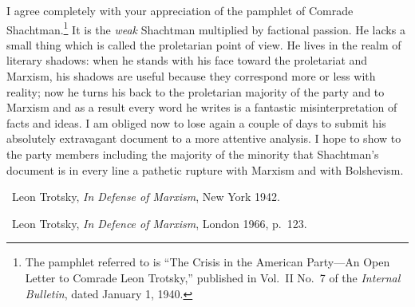 

I agree completely with your appreciation of the pamphlet of Comrade Shachtman.\footnote{The pamphlet referred to is ``The Crisis in the American Party---An Open Letter to Comrade Leon Trotsky,'' published in Vol.~II No.~7 of the \emph{Internal Bulletin}, dated January 1, 1940.} It is the \emph{weak} Shachtman multiplied by factional passion. He lacks a small thing which is called the proletarian point of view. He lives in the realm of literary shadows: when he stands with his face toward the proletariat and Marxism, his shadows are useful because they correspond more or less with reality; now he turns his back to the proletarian majority of the party and to Marxism and as a result every word he writes is a fantastic misinterpretation of facts and ideas. I am obliged now to lose again a couple of days to submit his absolutely extravagant document to a more attentive analysis. I hope to show to the party members including the majority of the minority that Shachtman’s document is in every line a pathetic rupture with Marxism and with Bolshevism.


\begin{letterinfo}
	\firstpublished\ Leon Trotsky, \emph{In Defense of Marxism}, New York 1942.
	
	\checkedagainst\ Leon Trotsky, \emph{In Defence of Marxism}, London 1966, p.~123.
	
	\footnoteslatter
\end{letterinfo}
